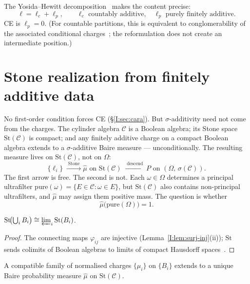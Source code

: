 The Yosida--Hewitt decomposition~\cite{YosidaHewitt1952}
makes the content precise:
\[
  \ell = \ell_c + \ell_p,
  \qquad
  \ell_c \text{ countably additive},
  \quad
  \ell_p \text{ purely finitely additive}.
\]
CE is $\ell_p = 0$.  (For countable partitions, this is equivalent to
conglomerability of the associated conditional
charges~\cite{Dubins1975, deFinetti1974}; the reformulation does not
create an intermediate position.)

\section{Stone realization from finitely additive data}
\label{I:sec:stone}

No first-order condition forces CE (\S\ref{I:sec:cara}).  But
$\sigma$-additivity need not come from the charges.  The cylinder
algebra $\mathcal{C}$ is a Boolean algebra; its Stone space
$\mathrm{St}(\mathcal{C})$ is compact; and any finitely additive charge
on a compact Boolean algebra extends to a $\sigma$-additive Baire
measure --- unconditionally.  The resulting measure lives on
$\mathrm{St}(\mathcal{C})$, not on $\Omega$:
\[
  \{\ell_i\}
  \;\xrightarrow{\;\text{Stone}\;}
  \hat{\mu} \text{ on } \mathrm{St}(\mathcal{C})
  \;\xrightarrow{\;\text{descend}\;}
  P \text{ on } (\Omega,\, \sigma(\mathcal{C})).
\]
The first arrow is free.  The second is not.  Each
$\omega \in \Omega$ determines a principal ultrafilter
$\mathrm{pure}(\omega) = \{E \in \mathcal{C} : \omega \in E\}$, but
$\mathrm{St}(\mathcal{C})$ also contains non-principal ultrafilters,
and $\hat{\mu}$ may assign them positive mass.  The question is whether
\[
  \hat{\mu}\!\bigl(\mathrm{pure}(\Omega)\bigr) = 1.
\]

\begin{proposition}
\label{I:prop:stepA}
$\mathrm{St}\!\bigl(\bigcup_i B_i\bigr) \cong \varprojlim_i
\mathrm{St}(B_i)$.
\end{proposition}

\begin{proof}
The connecting maps $\varphi_{ij}$ are injective
(Lemma~\ref{I:lem:surj-inj}(ii)); $\mathrm{St}$ sends colimits of
Boolean algebras to limits of compact Hausdorff
spaces~\cite[II.4]{johnstone1982}.
\end{proof}

\begin{proposition}
\label{I:prop:invlim}
A compatible family of normalised charges $\{\mu_i\}$ on $\{B_i\}$
extends to a unique Baire probability measure $\hat{\mu}$ on
$\mathrm{St}(\mathcal{C})$.
\end{proposition}

